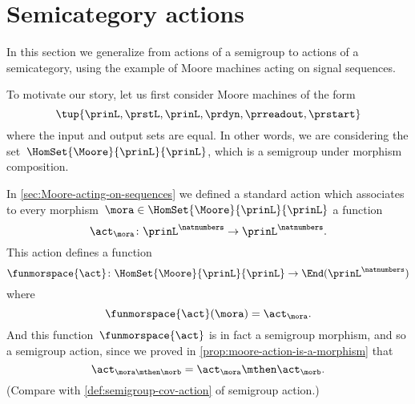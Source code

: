 
\section{Semicategory actions}
\label{sec:action-of-a-category}



In this section we generalize from actions of a semigroup to actions of a semicategory, using the example of Moore machines acting on signal sequences.

To motivate our story, let us first consider Moore machines of the form
\begin{equation*}
    \tup{\prinL,\prstL,\prinL,\prdyn,\prreadout,\prstart}
\end{equation*}
where the input and output sets are equal.
In other words, we are considering the set~$\HomSet{\Moore}{\prinL}{\prinL}$, which is a semigroup under morphism composition.

In \cref{sec:Moore-acting-on-sequences} we defined a standard action which associates to every morphism~$\mora \in \HomSet{\Moore}{\prinL}{\prinL}$ a function
\begin{equation*}
    \act_{\mora} \colon {\prinL}^\natnumbers \to {\prinL}^\natnumbers.
\end{equation*}
This action defines a function
\begin{equation}
    \funmorspace{\act} \colon  \HomSet{\Moore}{\prinL}{\prinL} \to \End ({\prinL}^{\natnumbers})
\end{equation}
where
\begin{equation*}
    \funmorspace{\act}(\mora) = \act_{\mora}.
\end{equation*}
And this function~$\funmorspace{\act}$ is in fact a semigroup morphism, and so a semigroup action, since we proved in \cref{prop:moore-action-is-a-morphism} that
\begin{equation*}
    \act_{\mora \mthen \morb} = \act_\mora \mthen \act_\morb.
\end{equation*}
(Compare with \cref{def:semigroup-cov-action} of semigroup action.)


